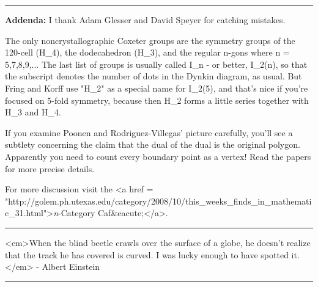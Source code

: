 \par\noindent\rule{\textwidth}{0.4pt}
\textbf{Addenda:} I thank Adam Glesser and David Speyer for catching 
mistakes.

The only noncrystallographic Coxeter groups are the
symmetry groups of the 120-cell (H_{4}), the dodecahedron
(H_{3}), and the regular n-gons where n = 5,7,8,9,...  The last
list of groups is usually called I_{n} - or better,
I_{2}(n), so that the subscript denotes the number of dots in
the Dynkin diagram, as usual.  But Fring and Korff use "H_{2}"
as a special name for I_{2}(5), and that's nice if you're
focused on 5-fold symmetry, because then H_{2} forms a little
series together with H_{3} and H_{4}.

If you examine Poonen and Rodriguez-Villegas' picture
carefully, you'll see a subtlety
concerning the claim that the dual of the dual is the original
polygon.  Apparently you need to count every boundary point as a vertex!
Read the papers for more precise details.

For more discussion visit the <a href = "http://golem.ph.utexas.edu/category/2008/10/this_weeks_finds_in_mathematic_31.html">\emph{n}-Category
Caf&eacute;</a>.

\par\noindent\rule{\textwidth}{0.4pt}
<em>When the blind beetle crawls over the surface of a globe, he doesn't
realize that the track he has covered is curved.  I was lucky enough
to have spotted it.</em> - Albert Einstein

\par\noindent\rule{\textwidth}{0.4pt}

